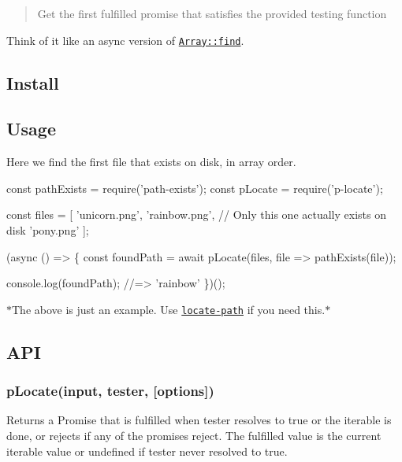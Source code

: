 \begin{quote}
Get the first fulfilled promise that satisfies the provided testing function \end{quote}


Think of it like an async version of \href{https://developer.mozilla.org/en/docs/Web/JavaScript/Reference/Global_Objects/Array/find}{\tt {\ttfamily Array\+::find}}.

\subsection*{Install}




\subsection*{Usage}

Here we find the first file that exists on disk, in array order.


\begin{DoxyCode}
const pathExists = require('path-exists');
const pLocate = require('p-locate');

const files = [
    'unicorn.png',
    'rainbow.png', // Only this one actually exists on disk
    'pony.png'
];

(async () => \{
    const foundPath = await pLocate(files, file => pathExists(file));

    console.log(foundPath);
    //=> 'rainbow'
\})();
\end{DoxyCode}


$\ast$\+The above is just an example. Use \href{https://github.com/sindresorhus/locate-path}{\tt {\ttfamily locate-\/path}} if you need this.$\ast$

\subsection*{A\+PI}

\subsubsection*{p\+Locate(input, tester, \mbox{[}options\mbox{]})}

Returns a {\ttfamily Promise} that is fulfilled when {\ttfamily tester} resolves to {\ttfamily true} or the iterable is done, or rejects if any of the promises reject. The fulfilled value is the current iterable value or {\ttfamily undefined} if {\ttfamily tester} never resolved to {\ttfamily true}.

